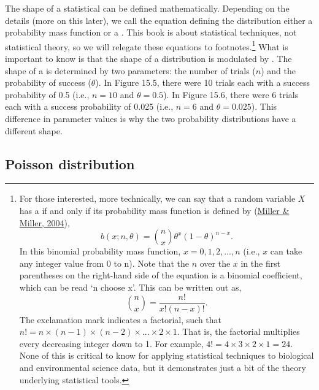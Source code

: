 \documentclass[
  openany]{krantz}
\begin{document}
The shape of a statistical  can be defined mathematically.
Depending on the details (more on this later), we call the equation defining the distribution either a probability mass function or a .
This book is about statistical techniques, not statistical theory, so we will relegate these equations to footnotes.\footnote{For those interested, more technically, we can say that a random variable \(X\) has a  if and only if its probability mass function is defined by (\protect\hyperlink{ref-Miller2004}{Miller \& Miller, 2004}), \[b \left(x; n, \theta \right) = {n \choose x} \theta^{x} \left(1 - \theta\right)^{n-x}.\] In this binomial probability mass function, \(x = 0, 1, 2, ..., n\) (i.e., \(x\) can take any integer value from 0 to n). Note that the \(n\) over the \(x\) in the first parentheses on the right-hand side of the equation is a binomial coefficient, which can be read `n choose x'. This can be written out as, \[{n \choose x} = \frac{n!}{x!(n - x)!}.\] The exclamation mark indicates a factorial, such that \(n! = n \times (n-1) \times (n - 2) \times ... \times 2 \times 1\). That is, the factorial multiplies every decreasing integer down to 1. For example, \(4! = 4 \times 3 \times 2 \times 1 = 24\). None of this is critical to know for applying statistical techniques to biological and environmental science data, but it demonstrates just a bit of the theory underlying statistical tools.}
What is important to know is that the shape of a distribution is modulated by \textbf{}.
The shape of a  is determined by two parameters: the number of trials (\(n\)) and the probability of success (\(\theta\)).
In Figure 15.5, there were 10 trials each with a success probability of 0.5 (i.e., \(n = 10\) and \(\theta = 0.5\)).
In Figure 15.6, there were 6 trials each with a success probability of 0.025 (i.e., \(n = 6\) and \(\theta = 0.025\)).
This difference in parameter values is why the two probability distributions have a different shape.

\hypertarget{poisson-distribution}{%
\subsection{Poisson distribution}\label{poisson-distribution}}
\end{document}
